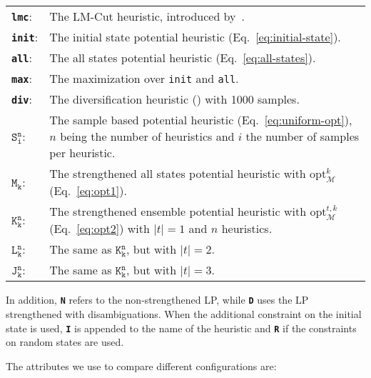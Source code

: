 \begin{center}
    \begin{tabularx}{\textwidth}{@{}lX@{}}
        \textbf{\texttt{lmc}}: & The LM-Cut heuristic, introduced by~\citeauthor{helmert-domshlak-icaps2009}. \\
        \textbf{\texttt{init}}: & The initial state potential heuristic (Eq.~\eqref{eq:initial-state}). \\
        \textbf{\texttt{all}}: & The all states potential heuristic (Eq.~\eqref{eq:all-states}). \\
        \textbf{\texttt{max}}: & The maximization over \texttt{init} and \texttt{all}. \\ %
        \textbf{\texttt{div}}: & The diversification heuristic (\citeauthor{seipp-et-al-icaps2015}) with 1000 samples. \\
        \textbf{$\texttt{S}_\texttt{i}^\texttt{n}$}: & The sample based potential heuristic (Eq.~\eqref{eq:uniform-opt}), $n$ being the number of heuristics and $i$ the number of samples per heuristic. \\ %
        \textbf{$\texttt{M}_\texttt{k}$}: & The strengthened all states potential heuristic with $\mathrm{opt}^k_\mathcal{M}$ (Eq.~\eqref{eq:opt1}). \\
        \textbf{$\texttt{K}_\texttt{k}^\texttt{n}$}: & The strengthened ensemble potential heuristic with $\mathrm{opt}^{t,k}_\mathcal{M}$ (Eq.~\eqref{eq:opt2}) with $|t|=1$ and $n$ heuristics. \\
        \textbf{$\texttt{L}_\texttt{k}^\texttt{n}$}: & The same as $\texttt{K}_\texttt{k}^\texttt{n}$, but with $|t|=2$. \\
        \textbf{$\texttt{J}_\texttt{k}^\texttt{n}$}: & The same as $\texttt{K}_\texttt{k}^\texttt{n}$, but with $|t|=3$. \\
    \end{tabularx}
\end{center}

In addition, \textbf{\texttt{N}} refers to the non-strengthened LP, while \textbf{\texttt{D}} uses the LP strengthened with disambiguations.
When the additional constraint on the initial state is used, \textbf{\texttt{I}} is appended to the name of the heuristic and \textbf{\texttt{R}} if the constraints on random states are used.

The attributes we use to compare different configurations are:

